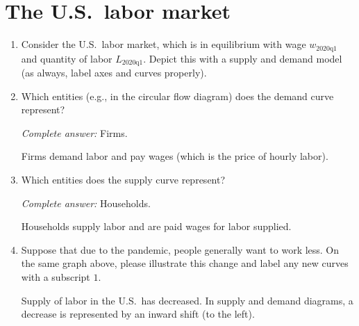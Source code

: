 \documentclass{assignment}
\date{Wednesday 5 October 2022}
\begin{document}
\RaggedRight

\beginsolutions{}

\section*{The U.S.~labor market}

\begin{enumerate}

\item Consider the U.S.~labor market, which is in equilibrium with wage $w_\text{2020q1}$ and quantity of labor $L_\text{2020q1}$. Depict this with a supply and demand model (as always, label axes and curves properly).

\begin{solution}
\begin{center}
\end{center}
\end{solution}

\item Which entities (e.g., in the circular flow diagram) does the demand curve represent?

\begin{solution}
\emph{Complete answer:} Firms.

Firms demand labor and pay wages (which is the price of hourly labor).
\end{solution}

\item Which entities does the supply curve represent?

\begin{solution}
\emph{Complete answer:} Households.

Households supply labor and are paid wages for labor supplied.
\end{solution}

\item Suppose that due to the pandemic, people generally want to work less. On the same graph above, please illustrate this change and label any new curves with a subscript $1$.

\begin{solution}
Supply of labor in the U.S.~has decreased. In supply and demand diagrams, a decrease is represented by an inward shift (to the left).


\end{solution}
\end{enumerate}
\end{document}
